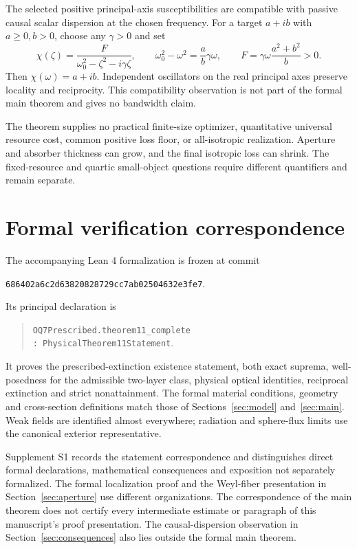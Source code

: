 \documentclass[11pt]{article}
\begin{document}
The selected positive principal-axis susceptibilities are compatible with passive causal scalar dispersion at the chosen frequency. For a target $a+ib$ with $a\geq0,b>0$, choose any $\gamma>0$ and set
\begin{equation}\label{eq:lorentz}
 \chi(\zeta)=\frac{F}{\omega_0^2-\zeta^2-i\gamma\zeta},\qquad
 \omega_0^2-\omega^2=\frac{a}{b}\gamma\omega,\qquad
 F=\gamma\omega\frac{a^2+b^2}{b}>0.
\end{equation}
Then $\chi(\omega)=a+ib$. Independent oscillators on the real principal axes preserve locality and reciprocity. This compatibility observation is not part of the formal main theorem and gives no bandwidth claim.

The theorem supplies no practical finite-size optimizer, quantitative universal resource cost, common positive loss floor, or all-isotropic realization. Aperture and absorber thickness can grow, and the final isotropic loss can shrink. The fixed-resource and quartic small-object questions require different quantifiers and remain separate.

\section{Formal verification correspondence}\label{sec:formal}
The accompanying Lean 4 formalization is frozen at commit
\begin{center}\small\texttt{686402a6c2d63820828729cc7ab02504632e3fe7}.\end{center}
Its principal declaration is
\begin{quote}
\texttt{OQ7Prescribed.theorem11\_complete}\\
\texttt{: PhysicalTheorem11Statement}.
\end{quote}
It proves the prescribed-extinction existence statement, both exact suprema, well-posedness for the admissible two-layer class, physical optical identities, reciprocal extinction and strict nonattainment. The formal material conditions, geometry and cross-section definitions match those of Sections~\ref{sec:model} and~\ref{sec:main}. Weak fields are identified almost everywhere; radiation and sphere-flux limits use the canonical exterior representative.

Supplement S1 records the statement correspondence and distinguishes direct formal declarations, mathematical consequences and exposition not separately formalized. The formal localization proof and the Weyl-fiber presentation in Section~\ref{sec:aperture} use different organizations. The correspondence of the main theorem does not certify every intermediate estimate or paragraph of this manuscript's proof presentation. The causal-dispersion observation in Section~\ref{sec:consequences} also lies outside the formal main theorem.
\end{document}
